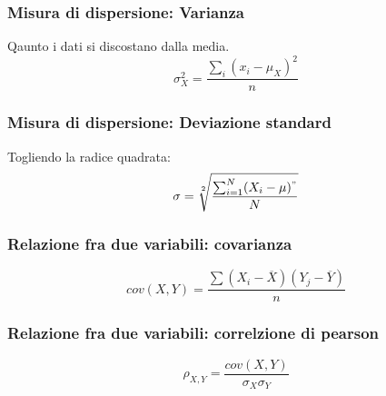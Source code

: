 \subsubsection{Misura di dispersione: Varianza}
Qaunto i dati si discostano dalla media.
\begin{equation}
    \sigma_X^2 = \frac{\sum_{i}(x_i - \mu_X)^2}{n}
    \label{eq:varianza}
\end{equation}

\subsubsection{Misura di dispersione: Deviazione standard}
Togliendo la radice quadrata:
\begin{equation}
    \label{eq:deviazione_standard}
    \sigma = \sqrt[2]{\frac{\sum_{i=1}^{N}(X_i - \mu)^"}{N}}
\end{equation}

\subsubsection{Relazione fra due variabili: covarianza}
\begin{equation}
    cov(X,Y) = \frac{\sum{(X_i -
    \overline{X})(Y_j
    - \overline{Y})}}
    {n}
    \label{eq:covarianza}
\end{equation}

\subsubsection{Relazione fra due variabili: correlzione di pearson}
\begin{equation}
    \rho_{X,Y} = \frac{cov(X,Y)}{\sigma_X\sigma_Y}
    \label{eq:pearson}
\end{equation}



























